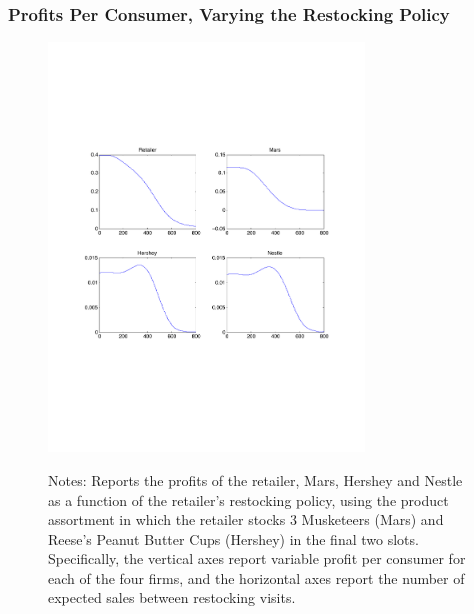 \begin{frame}
\frametitle{Profits Per Consumer, Varying the Restocking Policy}
\begin{figure}[htbp]
\begin{center}
\vspace{-0.2in}
\includegraphics[width=3.3in]{profitsbyfirm.pdf}
\label{fig:profits}
\end{center}
\tiny
Notes: Reports the profits of the retailer, Mars, Hershey and Nestle as a function of the retailer's restocking policy, using the product assortment in which the retailer stocks 3 Musketeers (Mars) and Reese's Peanut Butter Cups (Hershey) in the final two slots. Specifically, the vertical axes report variable profit per consumer for each of the four firms, and the horizontal axes report the number of expected sales between restocking visits.
\end{figure}
\end{frame}


